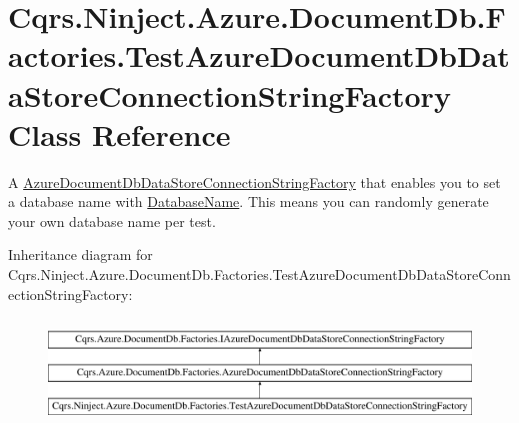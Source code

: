 \hypertarget{classCqrs_1_1Ninject_1_1Azure_1_1DocumentDb_1_1Factories_1_1TestAzureDocumentDbDataStoreConnectionStringFactory}{}\section{Cqrs.\+Ninject.\+Azure.\+Document\+Db.\+Factories.\+Test\+Azure\+Document\+Db\+Data\+Store\+Connection\+String\+Factory Class Reference}
\label{classCqrs_1_1Ninject_1_1Azure_1_1DocumentDb_1_1Factories_1_1TestAzureDocumentDbDataStoreConnectionStringFactory}


A \hyperlink{classCqrs_1_1Azure_1_1DocumentDb_1_1Factories_1_1AzureDocumentDbDataStoreConnectionStringFactory_a9b08d89df792a20e71f5278dbf39b804_a9b08d89df792a20e71f5278dbf39b804}{Azure\+Document\+Db\+Data\+Store\+Connection\+String\+Factory} that enables you to set a database name with \hyperlink{classCqrs_1_1Ninject_1_1Azure_1_1DocumentDb_1_1Factories_1_1TestAzureDocumentDbDataStoreConnectionStringFactory_ae0da37bd91333ad782058d32d4de2594_ae0da37bd91333ad782058d32d4de2594}{Database\+Name}. This means you can randomly generate your own database name per test.  


Inheritance diagram for Cqrs.\+Ninject.\+Azure.\+Document\+Db.\+Factories.\+Test\+Azure\+Document\+Db\+Data\+Store\+Connection\+String\+Factory\+:\begin{figure}[H]
\begin{center}
\leavevmode
\includegraphics[height=2.847458cm]{classCqrs_1_1Ninject_1_1Azure_1_1DocumentDb_1_1Factories_1_1TestAzureDocumentDbDataStoreConnectionStringFactory}
\end{center}
\end{figure}
